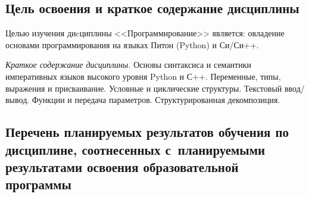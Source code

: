 \documentclass[a4paper,12pt]{article}
\begin{document}
\subsection{Цель освоения и краткое содержание дисциплины}
  
  Целью изучения диcциплины <<Программирование>> является: овладение основами программирования на языках Питон (Python) и Си/Си++.
  
  
  \textit{Краткое содержание дисциплины.} Основы синтаксиса и семантики императивных языков высокого уровня Python и С++. Переменные, типы, выражения и присваивание. Условные и циклические структуры. Текстовый ввод/вывод. Функции и передача параметров. Структурированная декомпозиция.
  
  



\subsection{Перечень планируемых результатов обучения по дисциплине, соотнесенных с~планируемыми результатами освоения образовательной программы}
\end{document}
